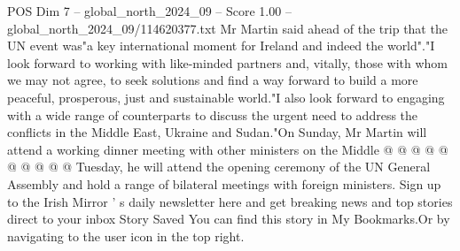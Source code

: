 \begin{textsample}{POS Dim 7 – global\_north\_2024\_09 – Score 1.00 – global\_north\_2024\_09/114620377.txt}
Mr Martin said ahead of the trip that the UN event was"a key international moment for Ireland and indeed the world"."I look forward to working with like-minded partners and, vitally, those with whom we may not agree, to seek solutions and find a way forward to build a more peaceful, prosperous, just and sustainable world."I also look forward to engaging with a wide range of counterparts to discuss the urgent need to address the conflicts in the Middle East, Ukraine and Sudan."On Sunday, Mr Martin will attend a working dinner meeting with other ministers on the Middle @ @ @ @ @ @ @ @ @ @ Tuesday, he will attend the opening ceremony of the UN General Assembly and hold a range of bilateral meetings with foreign ministers.
Sign up to the Irish Mirror ' s daily newsletter here and get breaking news and top stories direct to your inbox Story Saved You can find this story in My Bookmarks.Or by navigating to the user icon in the top right.

\end{textsample}
